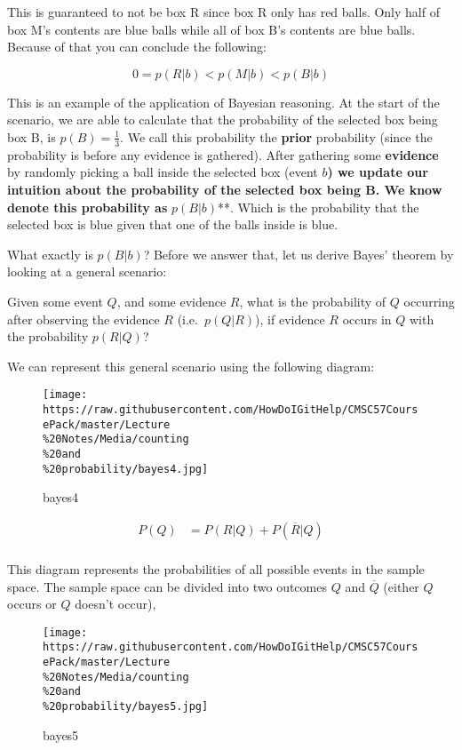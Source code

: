 This is guaranteed to not be box R since box R only has red balls. Only
half of box M's contents are blue balls while all of box B's contents
are blue balls. Because of that you can conclude the following:

\[
0=p(R|b)<p(M|b)<p(B|b)
\]

This is an example of the application of Bayesian reasoning. At the
start of the scenario, we are able to calculate that the probability of
the selected box being box B, is \textbf{\(p(B)=\frac{1}{3}\)}. We call
this probability the \textbf{prior} probability (since the probability
is before any evidence is gathered). After gathering some
\textbf{evidence} by randomly picking a ball inside the selected box
(event \textbf{\(b\)) we update our intuition about the probability of
the selected box being B. We know denote this probability as
}\(p(B|b)\)**. Which is the probability that the selected box is blue
given that one of the balls inside is blue.

What exactly is \textbf{\(p(B|b)\)}? Before we answer that, let us
derive Bayes' theorem by looking at a general scenario:

Given some event \textbf{\(Q\)}, and some evidence \textbf{\(R\)}, what
is the probability of \textbf{\(Q\)} occurring after observing the
evidence \textbf{\(R\)} (i.e.~\textbf{\(p(Q|R)\)}), if evidence
\textbf{\(R\)} occurs in \textbf{\(Q\)} with the probability
\textbf{\(p(R|Q)\)}?

We can represent this general scenario using the following diagram:

\begin{figure}
\centering
\texttt{[image: https://raw.githubusercontent.com/HowDoIGitHelp/CMSC57CoursePack/master/Lecture\\\%20Notes/Media/counting\\\%20and\\\%20probability/bayes4.jpg]}
\caption{bayes4}
\end{figure}

\[
\begin{aligned}
P(Q) &= P(R|Q) + P(\overline{R}|Q)\\
\end{aligned}
\]

This diagram represents the probabilities of all possible events in the
sample space. The sample space can be divided into two outcomes
\textbf{\(Q\)} and \textbf{\(\overline{Q}\)} (either \textbf{\(Q\)}
occurs or \textbf{\(Q\)} doesn't occur),

\begin{figure}
\centering
\texttt{[image: https://raw.githubusercontent.com/HowDoIGitHelp/CMSC57CoursePack/master/Lecture\\\%20Notes/Media/counting\\\%20and\\\%20probability/bayes5.jpg]}
\caption{bayes5}
\end{figure}


